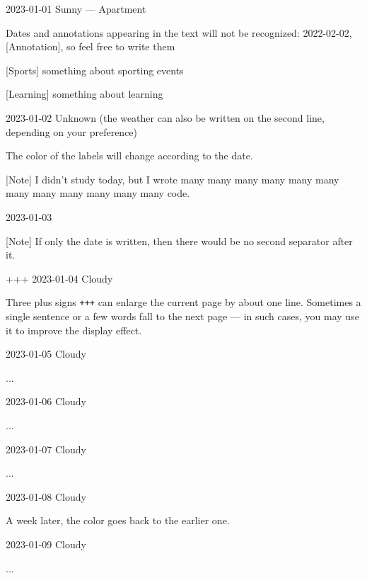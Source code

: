 \documentclass[11pt, paperstyle=light yellow, color entry]{jwjournal}
\begin{document}
2023-01-01 Sunny --- Apartment

  Dates and annotations appearing in the text will not be recognized: 2022-02-02, [Annotation], so feel free to write them

  [Sports] something about sporting events

  [Learning] something about learning



2023-01-02
Unknown (the weather can also be written on the second line, depending on your preference)

  The color of the labels will change according to the date.

  [Note] I didn't study today, but I wrote many many many many many many many many many many many many code.



2023-01-03

  [Note] If only the date is written, then there would be no second separator after it.


+++
2023-01-04  Cloudy

  Three plus signs \texttt{+++} can enlarge the current page by about one line. Sometimes a single sentence or a few words fall to the next page --- in such cases, you may use it to improve the display effect.



2023-01-05  Cloudy

  ...



2023-01-06  Cloudy

  ...



2023-01-07  Cloudy

  ...



2023-01-08  Cloudy

  A week later, the color goes back to the earlier one.



2023-01-09  Cloudy

  ...
\end{document}
